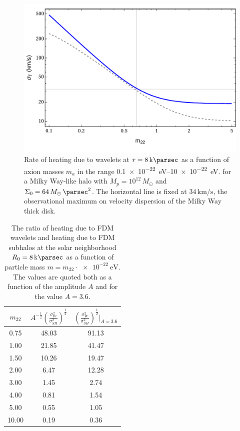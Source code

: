 \documentclass[usenatbib]{mnras}
\begin{document}
\begin{figure}
\includegraphics[width=\columnwidth]{FDM_mass_dep}
\vspace*{-5mm}
\caption{Rate of heating due to wavelets at $r = 8\, \si{\kilo \parsec}$ as a function of axion masses $m_{a}$ in the range \SIrange{0.1 e-22}{ 10 e-22}{\electronvolt}. for a Milky Way-like halo with $M_p = 10^{12} \, M_\odot$ and $\Sigma_0 = 64 \, M_\odot \, \si{\per\parsec^2}$. The horizontal line is fixed at $34\, \si{\kilo\meter\per\second}$, the observational maximum on velocity dispersion of the Milky Way thick disk. }
\label{fig:radiusheating}
\end{figure}

\begin{table} \label{FDM_ratio}
\begin{center}
 \begin{tabular}{||c c c||} 
 \hline
 $m_{22}$ & $A^{-\tfrac{1}{2}} \left( \frac{\sigma_{W}^2}{\sigma_{SH}^2} \right)^{\tfrac{1}{2}}$ & $ \left( \frac{\sigma_{W}^2}{\sigma_{SH}^2} \right)^{\tfrac{1}{2}} \bigg|_{A = 3.6}$ \\ [2.5ex] 
 \hline\hline
 0.75 & 48.03 & 91.13 \\ 
 \hline
 1.00 & 21.85 & 41.47 \\
 \hline
 1.50 & 10.26 & 19.47 \\
 \hline
 2.00 & 6.47 & 12.28 \\
 \hline
 3.00 & 1.45 & 2.74 \\
 \hline
 4.00 & 0.81 & 1.54 \\
 \hline
 5.00 & 0.55 & 1.05 \\
 \hline
 10.00 & 0.19 & 0.36 \\ [1ex] 
 \hline
\end{tabular}
\end{center}
\caption{The ratio of heating due to FDM wavelets and heating due to FDM subhalos at the solar neighborhood $R_0 = \SI{8}{\kilo\parsec}$ as a function of particle mass $m = m_{22} \cdot \SI{e-22}{\electronvolt}$. The values are quoted both as a function of the amplitude $A$ and for the value $A = 3.6$. }
\end{table}
\end{document}
